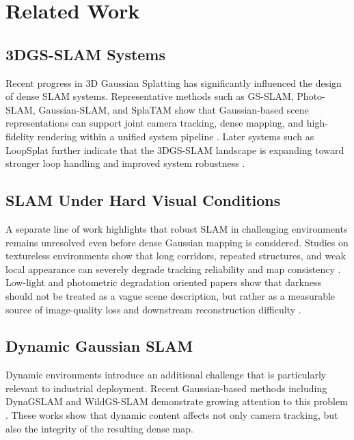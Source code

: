\documentclass[10pt,twocolumn]{article}
\begin{document}
\section{Related Work}

\subsection{3DGS-SLAM Systems}

Recent progress in 3D Gaussian Splatting has significantly influenced the design of dense SLAM systems. Representative methods such as GS-SLAM, Photo-SLAM, Gaussian-SLAM, and SplaTAM show that Gaussian-based scene representations can support joint camera tracking, dense mapping, and high-fidelity rendering within a unified system pipeline \cite{GSSLAM2024,PhotoSLAM2024,GaussianSLAM2024,SplaTAM2024}. Later systems such as LoopSplat further indicate that the 3DGS-SLAM landscape is expanding toward stronger loop handling and improved system robustness \cite{LoopSplat2024}.

\subsection{SLAM Under Hard Visual Conditions}

A separate line of work highlights that robust SLAM in challenging environments remains unresolved even before dense Gaussian mapping is considered. Studies on textureless environments show that long corridors, repeated structures, and weak local appearance can severely degrade tracking reliability and map consistency \cite{TexturelessORB2024}. Low-light and photometric degradation oriented papers show that darkness should not be treated as a vague scene description, but rather as a measurable source of image-quality loss and downstream reconstruction difficulty \cite{LLGaussianMap2024}.

\subsection{Dynamic Gaussian SLAM}

Dynamic environments introduce an additional challenge that is particularly relevant to industrial deployment. Recent Gaussian-based methods including DynaGSLAM and WildGS-SLAM demonstrate growing attention to this problem \cite{DynaGSLAM2024,WildGSSLAM2024}. These works show that dynamic content affects not only camera tracking, but also the integrity of the resulting dense map.
\end{document}
